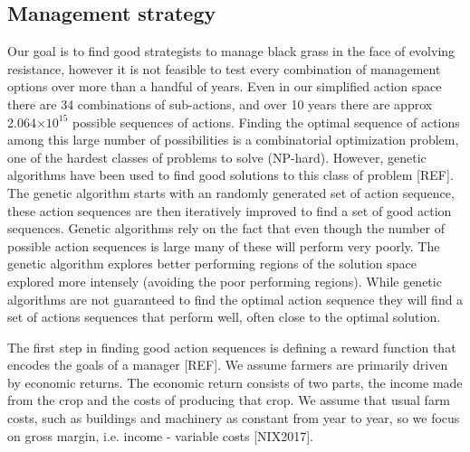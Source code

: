 \documentclass[12pt, a4paper]{article}
\begin{document}
\subsection*{Management strategy}
Our goal is to find good strategists to manage black grass in the face of evolving resistance, however it is not feasible to test every combination of management options over more than a handful of years. Even in our simplified action space there are 34 combinations of sub-actions, and over 10 years there are approx 2.064$\times 10^{15}$ possible sequences of actions. Finding the optimal sequence of actions among this large number of possibilities is a combinatorial optimization problem, one of the hardest classes of problems to solve (NP-hard). However, genetic algorithms have been used to find good solutions to this class of problem [REF]. The genetic algorithm starts with an randomly generated set of action sequence, these action sequences are then iteratively improved to find a set of good action sequences. Genetic algorithms rely on the fact that even though the number of possible action sequences is large many of these will perform very poorly. The genetic algorithm explores better performing regions of the solution space explored more intensely (avoiding the poor performing regions). While genetic algorithms are not guaranteed to find the optimal action sequence they will find a set of actions sequences that perform well, often close to the optimal solution.   

The first step in finding good action sequences is defining a reward function that encodes the goals of a manager [REF]. We assume farmers are primarily driven by economic returns. The economic return consists of two parts, the income made from the crop and the costs of producing that crop. We assume that usual farm costs, such as buildings and machinery as constant from year to year, so we focus on gross margin, i.e. income - variable costs [NIX2017].
\end{document}
